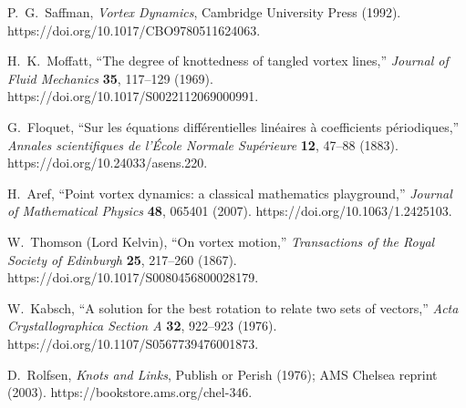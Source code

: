P.~G.~Saffman,
\emph{Vortex Dynamics},
Cambridge University Press (1992).
https://doi.org/10.1017/CBO9780511624063.

H.~K.~Moffatt,
``The degree of knottedness of tangled vortex lines,''
\emph{Journal of Fluid Mechanics} \textbf{35}, 117--129 (1969).
https://doi.org/10.1017/S0022112069000991.

G.~Floquet,
``Sur les équations différentielles linéaires à coefficients périodiques,''
\emph{Annales scientifiques de l'École Normale Supérieure} \textbf{12}, 47--88 (1883).
https://doi.org/10.24033/asens.220.

H.~Aref,
``Point vortex dynamics: a classical mathematics playground,''
\emph{Journal of Mathematical Physics} \textbf{48}, 065401 (2007).
https://doi.org/10.1063/1.2425103.

W.~Thomson (Lord Kelvin),
``On vortex motion,''
\emph{Transactions of the Royal Society of Edinburgh} \textbf{25}, 217--260 (1867).
https://doi.org/10.1017/S0080456800028179.

W.~Kabsch,
``A solution for the best rotation to relate two sets of vectors,''
\emph{Acta Crystallographica Section A} \textbf{32}, 922--923 (1976).
https://doi.org/10.1107/S0567739476001873.

D.~Rolfsen,
\emph{Knots and Links},
Publish or Perish (1976); AMS Chelsea reprint (2003).
https://bookstore.ams.org/chel-346.
